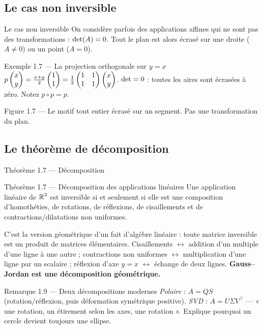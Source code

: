 \subsection{Le cas non inversible}
\begin{frame}{Le cas non inversible}
  \small On considère parfois des applications affines qui ne sont pas
  des transformations : $\operatorname{det}(A) = 0$. Tout le plan est alors écrasé
  sur une droite ($A\neq 0$) ou un point ($A=0$).

  \begin{Enonce}{Exemple 1.7 --- La projection orthogonale sur $y=x$}
    \small $p\begin{pmatrix}x\\ y\end{pmatrix} = \tfrac{x+y}{2}\begin{pmatrix}1\\ 1\end{pmatrix}
      = \tfrac12\begin{pmatrix}1 & 1\\ 1 & 1\end{pmatrix}\begin{pmatrix}x\\ y\end{pmatrix}$. $\operatorname{det} = 0$ : toutes les
      aires sont écrasées à zéro. Notez $p\circ p = p$.
  \end{Enonce}
  \begin{center}\small Figure 1.7 --- Le motif tout entier écrasé sur un
  segment. Pas une transformation du plan.\end{center}
\end{frame}

\subsection{Le théorème de décomposition}
\begin{frame}{Théorème 1.7 --- Décomposition}
  \begin{Enonce}{Théorème 1.7 --- Décomposition des applications linéaires}
    Une application linéaire de $\operatorname{\mathbb{R}}^2$ est inversible si et seulement
    si elle est une composition d'homothéties, de rotations, de
    réflexions, de cisaillements et de contractions/dilatations non
    uniformes.
  \end{Enonce}
  \small C'est la version géométrique d'un fait d'algèbre linéaire :
  toute matrice inversible est un produit de matrices élémentaires.
  Cisaillements $\leftrightarrow$ addition d'un multiple d'une ligne à
  une autre ; contractions non uniformes $\leftrightarrow$
  multiplication d'une ligne par un scalaire ; réflexion d'axe $y=x$
  $\leftrightarrow$ échange de deux lignes. \textbf{Gauss--Jordan est
  une décomposition géométrique.}
  \begin{Rem}{Remarque 1.9 --- Deux décompositions modernes}
    \footnotesize \emph{Polaire} : $A=QS$ (rotation/réflexion, puis
    déformation symétrique positive). \emph{SVD} : $A=U\Sigma V^\top$
    --- « une rotation, un étirement selon les axes, une rotation ».
    Explique pourquoi un cercle devient toujours une ellipse.
  \end{Rem}
\end{frame}
